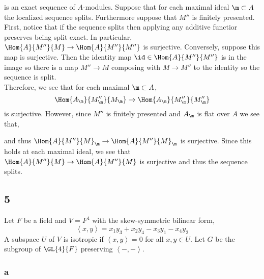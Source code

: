 \documentclass[12pt]{article}
\newcommand{\inner}[2]{\left< #1, #2 \right>}
\begin{document}
\begin{center}
\end{center}
is an exact sequence of $A$-modules. Suppose that for each maximal ideal $\m \subset A$ the localized sequence splits. Furthermore suppose that $M''$ is finitely presented. 
\bigskip\\
First, notice that if the sequence splits then applying any additive functior preserves being split exact. In particular, $\Hom{A}{M''}{M} \to \Hom{A}{M''}{M''}$ is surjective. Conversely, suppose this map is surjective. Then the identity map $\id \in \Hom{A}{M''}{M''}$ is in the image so there is a map $M'' \to M$ composing with $M \to M''$ to the identity so the sequence is split.
\bigskip\\
Therefore, we see that for each maximal $\m \subset A$,
\[ \Hom{A_\m}{M''_\m}{M_\m} \to \Hom{A_\m}{M''_\m}{M''_\m} \]
is surjective. However, since $M''$ is finitely presented and $A_\m$ is flat over $A$ we see that,
\begin{center}
\end{center}
and thus $\Hom{A}{M''}{M}_\m \to \Hom{A}{M''}{M}_\m$ is surjective. Since this holds at each maximal ideal, we see that $\Hom{A}{M''}{M} \to \Hom{A}{M''}{M}$ is surjective and thus the sequence splits.

\subsection{5}

Let $F$ be a field and $V = F^4$ with the skew-symmetric bilinear form,
\[ \inner{x}{y} = x_1 y_3 + x_2 y_4 - x_3 y_1 - x_4 y_2 \]
A subspace $U$ of $V$ is isotropic if $\inner{x}{y} = 0$ for all $x,y \in U$. Let $G$ be the subgroup of $\GL{4}{F}$ preserving $\inner{-}{-}$.

\subsubsection{a}
\end{document}
